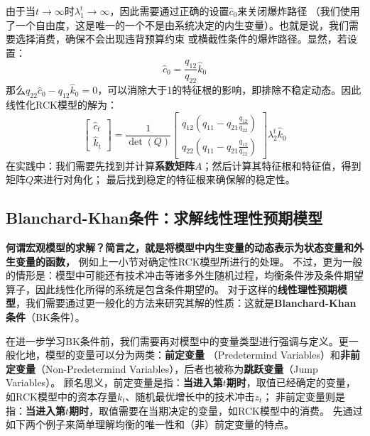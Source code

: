 由于当$t\rightarrow \infty$时$\lambda_1^t\rightarrow \infty$，因此需要通过正确的设置$\hat{c}_0$来关闭爆炸路径
（我们使用了一个自由度，这是唯一的一个不是由系统决定的内生变量）。也就是说，我们需要选择消费，确保不会出现违背预算约束
或横截性条件的爆炸路径。显然，若设置：
\begin{equation*}
    \hat{c}_0 = \frac{q_{12}}{q_{22}}\hat{k}_0
\end{equation*}
那么$q_{22}\hat{c}_0-q_{12}\hat{k}_0 = 0$，可以消除大于1的特征根的影响，即排除不稳定动态。因此线性化RCK模型的解为：
\[
    \begin{bmatrix}
        \hat{c}_{t} \\
        \hat{k}_{t}
    \end{bmatrix}
    =
    \frac{1}{\operatorname{det}(Q)}
    \begin{bmatrix}
        q_{12}\left(q_{11}-q_{21} \frac{q_{12}}{q_{22}}\right) \\
        q_{22}\left(q_{11}-q_{21} \frac{q_{12}}{q_{22}}\right)
    \end{bmatrix}
    \lambda_2^t \hat{k}_0
\]
在实践中：我们需要先找到并计算\textbf{系数矩阵}$A$；然后计算其特征根和特征值，得到矩阵$Q$来进行对角化；
最后找到稳定的特征根来确保解的稳定性。


\subsection{Blanchard-Khan条件：求解线性理性预期模型}

\textbf{何谓宏观模型的求解？简言之，就是将模型中内生变量的动态表示为状态变量和外生变量的函数，}
例如上一小节对确定性RCK模型所进行的处理。
不过，更为一般的情形是：模型中可能还有技术冲击等诸多外生随机过程，均衡条件涉及条件期望算子，因此线性化所得的系统是包含条件期望的。
对于这样的\textbf{线性理性预期模型}，我们需要通过更一般化的方法来研究其解的性质：这就是\textbf{Blanchard-Khan条件}（BK条件）。

在进一步学习BK条件前，我们需要再对模型中的变量类型进行强调与定义。更一般化地，模型的变量可以分为两类：\textbf{前定变量}
（Predetermind Variables）和\textbf{非前定变量}（Non-Predetermind Variables），后者也被称为\textbf{跳跃变量}（Jump Variables）。
顾名思义，前定变量是指：\textbf{当进入第$t$期时}，取值已经确定的变量，
如RCK模型中的资本存量$k_t$、随机最优增长中的技术冲击$z_t$；
非前定变量则是指：\textbf{当进入第$t$期时}，取值需要在当期决定的变量，如RCK模型中的消费。
先通过如下两个例子来简单理解均衡的唯一性和（非）前定变量的特点。

